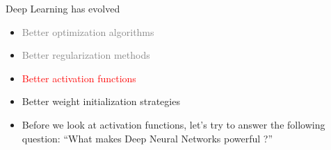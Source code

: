 \begin{frame}
\end{frame}


\begin{frame}
	\begin{block}{Deep Learning has evolved}
		\begin{itemize}
			\justifying
			\item \textcolor{gray}{Better optimization algorithms}
			\item \textcolor{gray}{Better regularization methods}
			\item \textcolor{red}{Better activation functions}
			\item Better weight initialization strategies
		\end{itemize}
		
	\end{block}
\end{frame}


\begin{frame}
	\begin{itemize}
		\justifying
		\item Before we look at activation functions, let's try to answer the following question: ``What makes Deep Neural Networks powerful ?''
	\end{itemize}
\end{frame}


